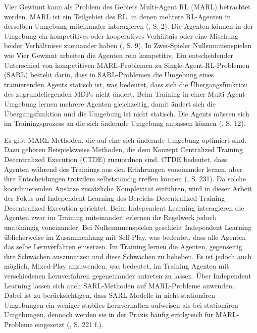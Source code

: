 Vier Gewinnt kann als Problem des Gebiets Multi-Agent RL (MARL) betrachtet werden. MARL ist ein Teilgebiet des RL, in denen mehrere RL-Agenten in derselben Umgebung miteinander interagieren (\cite{Albrecht.2024}, S. 2). Die Agenten können in der Umgebung ein kompetitives oder kooperatives Verhältnis oder eine Mischung beider Verhältnisse zueinander haben (\cite{Albrecht.2024}, S. 9). In Zwei-Spieler Nullsummenspielen wie Vier Gewinnt arbeiten die Agenten rein kompetitiv. Ein entscheidender Unterschied von kompetitiven MARL-Problemen zu Single-Agent-RL-Problemen (SARL) besteht darin, dass in SARL-Problemen die Umgebung eines trainierenden Agents statisch ist, was bedeutet, dass sich die Übergangsfunktion des zugrundeliegenden MDPs nicht ändert. Beim Training in einer Multi-Agent-Umgebung lernen mehrere Agenten gleichzeitig, damit ändert sich die Übergangsfunktion und die Umgebung ist nicht statisch. Die Agents müssen sich im Trainingsprozess an die sich ändernde Umgebung anpassen können (\cite{Albrecht.2024}, S. 12).

Es gibt MARL-Methoden, die auf eine sich ändernde Umgebung optimiert sind. Dazu gehören Beispielsweise Methoden, die dem Konzept \glqq Centralized Training Decentralized Execution\grqq{} (CTDE) zuzuordnen sind. CTDE bedeutet, dass Agenten während des Trainings aus den Erfahrungen voneinander lernen, aber ihre Entscheidungen trotzdem selbstständig treffen können (\cite{Albrecht.2024}, S. 231). Da solche koordinierenden Ansätze zusätzliche Komplexität einführen, wird in dieser Arbeit der Fokus auf Independent Learning des Bereichs \glqq Decentralized Training Decentralized Execution\grqq{} gerichtet. Beim Independent Learning interagieren die Agenten zwar im Training miteinander, erlernen ihr Regelwerk jedoch unabhängig voneinander. Bei Nullsummenspielen geschieht Independent Learning üblicherweise im Zusammenhang mit Self-Play, was bedeutet, dass alle Agenten das selbe Lernverfahren einsetzen. Im Training lernen die Agenten, gegenseitig ihre Schwächen auszunutzen und diese Schwächen zu beheben. Es ist jedoch auch möglich, Mixed-Play anzuwenden, was bedeutet, im Training Agenten mit verschiedenen Lernverfahren gegeneinander antreten zu lassen. Über Independent Learning lassen sich auch SARL-Methoden auf MARL-Probleme anwenden. Dabei ist zu berücksichtigen, dass SARL-Modelle in nicht-stationären Umgebungen ein weniger stabiles Lernverhalten aufweisen als bei stationären Umgebungen, dennoch werden sie in der Praxis häufig erfolgreich für MARL-Probleme eingesetzt (\cite{Albrecht.2024}, S. 221 f.).

